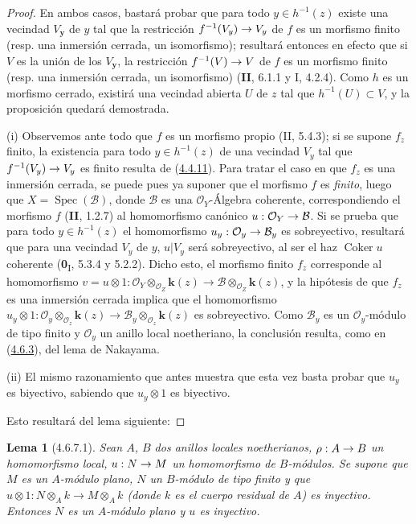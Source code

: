 \documentclass[10pt,oneside,openany]{book}
\theoremstyle{egaenv}\newtheorem*{env}{---}
\theoremstyle{egastatement}
\newtheorem*{lemma}{Lema}
\theoremstyle{egadescription}
\newcommand{\oldpage}[2][]{\marginnote{\normalfont\scriptsize\textbf{#1}\,|\,#2}\ignorespaces}
\renewcommand{\to}{\mathchoice{\longrightarrow}{\rightarrow}{\rightarrow}{\rightarrow}}
\begin{document}
\begin{proof}
En ambos casos, bastará probar que para todo $y\in h^{-1}(z)$
existe una vecindad $V_{\boldsymbol{y}}$ de $y$ tal que la restricción
$f^{-1}(V_y)\to V_y$ de $f$ es un morfismo finito (resp. una inmersión
cerrada, un isomorfismo); resultará entonces en efecto que si $V$ es la
unión de los $V_{\boldsymbol{y}}$, la restricción $f^{-1}(V)\to V$ de $f$ es un morfismo
finito (resp. una inmersión cerrada, un isomorfismo) (\textbf{II}, 6.1.1 y I, 4.2.4).
Como $h$ es un morfismo cerrado, existirá una vecindad abierta $U$ de $z$
tal que $h^{-1}(U)\subset V$, y la proposición quedará demostrada.

\noindent (i) Observemos ante todo que $f$ es un morfismo propio
(II, 5.4.3); si se
\oldpage[III]{143}
supone $f_z$ finito, la existencia para todo
$y\in h^{-1}(z)$ de una vecindad $V_y$ tal que $f^{-1}(V_y)\to V_y$ es finito
resulta de (\hyperref[III.4.4.11-fr]{4.4.11}).
Para tratar el caso en que $f_z$ es una inmersión cerrada, se puede pues ya
suponer que el morfismo $f$ es \emph{finito}, luego que
$X=\operatorname{Spec}(\mathcal B)$, donde $\mathcal B$ es una
$\mathcal O_Y$-Álgebra coherente, correspondiendo el morfismo $f$ (\textbf{II}, 1.2.7)
al homomorfismo canónico $u:\mathcal O_Y\to\mathcal B$. Si se prueba
que para todo $y\in h^{-1}(z)$ el homomorfismo
$u_y:\mathcal O_y\to\mathcal B_y$ es sobreyectivo, resultará que para una
vecindad $V_y$ de $y$, $u|V_y$ será sobreyectivo, al ser el haz
$\operatorname{Coker}u$ coherente (\textbf{0}\textsubscript{I}, 5.3.4 y 5.2.2).
Dicho esto, el morfismo finito $f_z$ corresponde al homomorfismo
$v=u\otimes1:
\mathcal O_Y\otimes_{\mathcal O_Z}\boldsymbol{k}(z)
\longrightarrow
\mathcal B\otimes_{\mathcal O_Z}\boldsymbol{k}(z)$,
y la hipótesis de que $f_z$ es una inmersión cerrada implica que
el homomorfismo
$u_y\otimes1:
\mathcal O_y\otimes_{\mathcal O_z}\boldsymbol{k}(z)
\longrightarrow
\mathcal B_y\otimes_{\mathcal O_z}\boldsymbol{k}(z)$
es sobreyectivo. Como $\mathcal B_y$ es un $\mathcal O_y$-módulo de tipo
finito y $\mathcal O_y$ un anillo local noetheriano, la conclusión resulta,
como en (\hyperref[III.4.6.3-fr]{4.6.3}), del lema de Nakayama.

\noindent (ii) El mismo razonamiento que antes muestra que
esta vez basta probar que $u_y$ es biyectivo, sabiendo que
$u_y\otimes1$ es biyectivo.

Esto resultará del lema siguiente:
\end{proof}

\begin{lemma}[4.6.7.1]
\label{III.4.6.7.1-fr}
Sean $A$, $B$ dos anillos locales noetherianos,
$\rho:A\to B$ un homomorfismo local, $u:N\to M$ un homomorfismo de
$B$-módulos. Se supone que $M$ es un $A$-módulo plano, $N$ un $B$-módulo
de tipo finito y que
$u\otimes1:N\otimes_Ak\longrightarrow M\otimes_Ak$
(donde $k$ es el cuerpo residual de $A$) es inyectivo. Entonces $N$ es un
$A$-módulo plano y $u$ es inyectivo.
\end{lemma}
\end{document}
